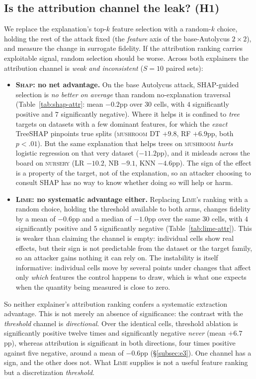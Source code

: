 \documentclass[sigconf,anonymous,review]{acmart}
\begin{document}
\subsection{Is the attribution channel the leak? (H1)}
\label{subsec:e2}
We replace the explanation's top-$k$ feature selection with a random-$k$ choice, holding the rest of
the attack fixed (the \emph{feature} axis of the base-Autolycus $2{\times}2$), and measure the change
in surrogate fidelity. If the attribution ranking carries exploitable signal, random selection should
be worse. Across both explainers the attribution channel is \emph{weak and inconsistent} ($S{=}10$
paired sets):
\begin{itemize}
  \item \textbf{\textsc{Shap}: no net advantage.} On the base Autolycus attack, SHAP-guided selection
  is \emph{no better on average} than random no-explanation traversal (Table~\ref{tab:shap-attr}: mean $-0.2$pp over $30$ cells, with $4$ significantly positive and $7$ significantly negative). Where it
  helps it is confined to \emph{tree} targets on datasets with a few dominant features, for which the
  \emph{exact} TreeSHAP pinpoints true splits (\textsc{mushroom} DT $+9.8$, RF $+6.9$pp, both
  $p{<}.01$). But the same explanation that helps trees on
  \textsc{mushroom} \emph{hurts} logistic regression on that very dataset ($-11.2$pp), and it misleads
  across the board on \textsc{nursery} (LR $-10.2$, NB $-9.1$, KNN $-4.6$pp). The sign of the effect is
  a property of the target, not of the explanation, so an attacker choosing to consult SHAP has no way
  to know whether doing so will help or harm.
  \item \textbf{\textsc{Lime}: no systematic advantage either.} Replacing \textsc{Lime}'s ranking with a random choice, holding the threshold available to both arms, changes fidelity by a mean of
  $-0.6$pp and a median of $-1.0$pp over the same $30$ cells, with $4$ significantly positive and $5$
  significantly negative (Table~\ref{tab:lime-attr}). This is weaker than claiming the channel is empty: individual cells
  show real effects, but their sign is not predictable from the dataset or the target family, so an
  attacker gains nothing it can rely on. The instability is itself informative: individual cells move
  by several points under changes that affect only \emph{which} features the control happens to draw,
  which is what one expects when the quantity being measured is close to zero.
\end{itemize}
So neither explainer's attribution ranking confers a systematic extraction advantage. This is not
merely an absence of significance: the contrast with the \emph{threshold} channel is \emph{directional}.
Over the identical cells, threshold ablation is significantly positive twelve times and significantly
negative \emph{never} (mean $+6.7$pp), whereas attribution is significant in both directions, four
times positive against five negative, around a mean of $-0.6$pp (\S\ref{subsec:e3}). One channel has a sign, and the other does not.
What \textsc{Lime} supplies is not a useful feature ranking but a discretization \emph{threshold}.
\end{document}
